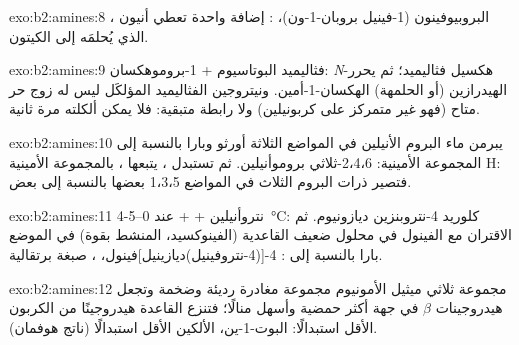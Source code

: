 \begin{solution}{exo:b2:amines:8}
البروبيوفينون (1-فينيل بروبان-1-ون)، : إضافة واحدة تعطي أنيون ،
الذي يُحلمَه إلى الكيتون.
\end{solution}

\begin{solution}{exo:b2:amines:9}
فثاليميد البوتاسيوم + 1-بروموهكسان: \textit{N}-هكسيل فثاليميد؛ ثم يحرر الهيدرازين (أو الحلمهة)
الهكسان-1-أمين. ونيتروجين الفثاليميد المؤلكَل ليس له زوج حر متاح (فهو غير
متمركز على كربونيلين) ولا رابطة  متبقية: فلا يمكن ألكلته مرة ثانية.
\end{solution}

\begin{solution}{exo:b2:amines:10}
يبرمن ماء البروم الأنيلين في المواضع الثلاثة أورثو وبارا بالنسبة إلى المجموعة
الأمينية: 2،4،6-ثلاثي بروموأنيلين. ثم تستبدل ، يتبعها ، بالمجموعة الأمينية H: فتصير ذرات
البروم الثلاث في المواضع 1،3،5 بعضها بالنسبة إلى بعض.
\end{solution}

\begin{solution}{exo:b2:amines:11}
4-نتروأنيلين +  +  عند 0--\qty{5}{\degreeCelsius}: كلوريد 4-نتروبنزين ديازونيوم.
ثم الاقتران مع الفينول في محلول ضعيف القاعدية (الفينوكسيد، المنشط بقوة) في
الموضع بارا بالنسبة إلى : 4-[(4-نتروفينيل)ديازينيل]فينول، ، صبغة
برتقالية.
\end{solution}

\begin{solution}{exo:b2:amines:12}
مجموعة ثلاثي ميثيل الأمونيوم مجموعة مغادرة رديئة وضخمة وتجعل هيدروجينات $\beta$ في
جهة  أكثر حمضية وأسهل منالًا؛ فتنزع القاعدة هيدروجينًا من الكربون الأقل
استبدالًا: البوت-1-ين، الألكين الأقل استبدالًا (ناتج هوفمان).
\end{solution}


